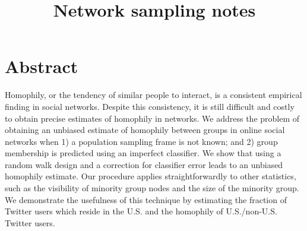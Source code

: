 \documentclass[a4paper]{article}
\title{Network sampling notes}
\author{}
\begin{document}
\maketitle




\tableofcontents


\begin{comment}
\section{Paper outline}


\begin{outline}[enumerate]
\1 Problems to address
	\2 Sampling statistics of graph nodes
    \2 Sampling statistics of graph nodes with an imperfect classifier
    \2 How close is our proposed method to optimal?
    \2 How can we see if this works in real life?
\1 Previous work
	\2 Naive methods (snowball, pure RW, edge, node, ego network)
    \2 RDS
    	\3 RDS as MCMC intro
        \3 RDS tweaks
    	\3 Importance resampling
	\2 Homophily
    	\3 Areas where it exists
        \3 Various indexes
        \3 Coleman index
    \2 Visibility
    	\3 What is it?
    \2 (What's a classifier?)
\1 Findings (each with perfect/imperfect classification)
    \2 Graph generation
    	\3 Power law with homophily
	\2 Group size
    \2 Crossgroup links
    \2 Coleman homophily
    \2 Visibility of minority group
    \2 Crossnational ties
\end{outline}

\end{comment}

\section{Abstract}

Homophily, or the tendency of similar people to interact, is a consistent empirical finding in social networks. Despite this consistency, it is still difficult and costly to obtain precise estimates of homophily in networks. We address the problem of obtaining an unbiased estimate of homophily between groups in online social networks when 1) a population sampling frame is not known; and 2) group membership is predicted using an imperfect classifier. We show that using a random walk design and a correction for classifier error leads to an unbiased homophily estimate. Our procedure applies straightforwardly to other statistics, such as the visibility of minority group nodes and the size of the minority group. We demonstrate the usefulness of this technique by estimating the fraction of Twitter users which reside in the U.S. and the homophily of U.S./non-U.S. Twitter users.
\end{document}
